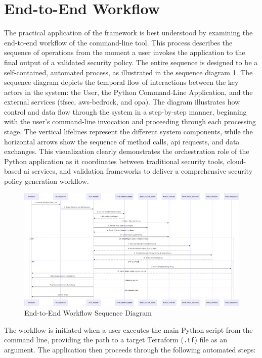 \section{End-to-End Workflow}


The practical application of the framework is best understood by examining the end-to-end workflow of the command-line tool. This process describes the sequence of operations from the moment a user invokes the application to the final output of a validated security policy. The entire sequence is designed to be a self-contained, automated process, as illustrated in the sequence diagram \ref{fig:e2e_workflow}. The sequence diagram depicts the temporal flow of interactions between the key actors in the system: the User, the Python Command-Line Application, and the external services (tfsec, \gls{aws-bedrock}, and \gls{opa}). The diagram illustrates how control and data flow through the system in a step-by-step manner, beginning with the user's command-line invocation and proceeding through each processing stage. The vertical lifelines represent the different system components, while the horizontal arrows show the sequence of method calls, \gls{api} requests, and data exchanges. This visualization clearly demonstrates the \gls{orchestration} role of the Python application as it coordinates between traditional security tools, cloud-based \gls{ai} services, and validation frameworks to deliver a comprehensive security policy generation workflow.
\begin{landscape}
\thispagestyle{empty}
\begin{figure}[p]
\centering
\includegraphics[width=0.9\linewidth,height=0.7\textheight,keepaspectratio]{Figures/image.pdf}
\caption{End-to-End Workflow Sequence Diagram}
\label{fig:e2e_workflow}
\end{figure}
\end{landscape}

The workflow is initiated when a user executes the main Python script from the command line, providing the path to a target Terraform (\texttt{.tf}) file as an argument. The application then proceeds through the following automated steps:

